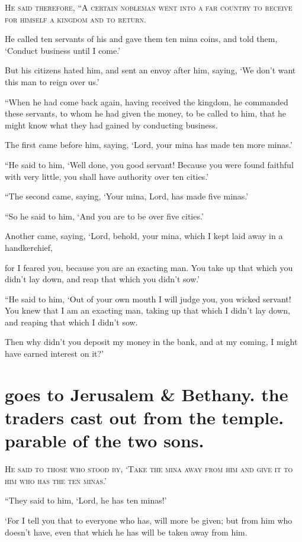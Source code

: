 \lettrine{H}{e said therefore, “A certain nobleman went into a far country to receive for himself a kingdom and to return.}

He called ten servants of his and gave them ten mina coins,  and told them, ‘Conduct business until I come.’

But his citizens hated him, and sent an envoy after him, saying, ‘We don’t want this man to reign over us.’

“When he had come back again, having received the kingdom, he commanded these servants, to whom he had given the money, to be called to him, that he might know what they had gained by conducting business.

The first came before him, saying, ‘Lord, your mina has made ten more minas.’

“He said to him, ‘Well done, you good servant! Because you were found faithful with very little, you shall have authority over ten cities.’

“The second came, saying, ‘Your mina, Lord, has made five minas.’

“So he said to him, ‘And you are to be over five cities.’

Another came, saying, ‘Lord, behold, your mina, which I kept laid away in a handkerchief,

for I feared you, because you are an exacting man. You take up that which you didn’t lay down, and reap that which you didn’t sow.’

“He said to him, ‘Out of your own mouth I will judge you, you wicked servant! You knew that I am an exacting man, taking up that which I didn’t lay down, and reaping that which I didn’t sow.

Then why didn’t you deposit my money in the bank, and at my coming, I might have earned interest on it?’


\clearpage \section*{goes to Jerusalem \& Bethany. the traders cast out from the temple. parable of the two sons.}

\lettrine{H}{e said to those who stood by, ‘Take the mina away from him and give it to him who has the ten minas.’}

“They said to him, ‘Lord, he has ten minas!’

‘For I tell you that to everyone who has, will more be given; but from him who doesn’t have, even that which he has will be taken away from him.

